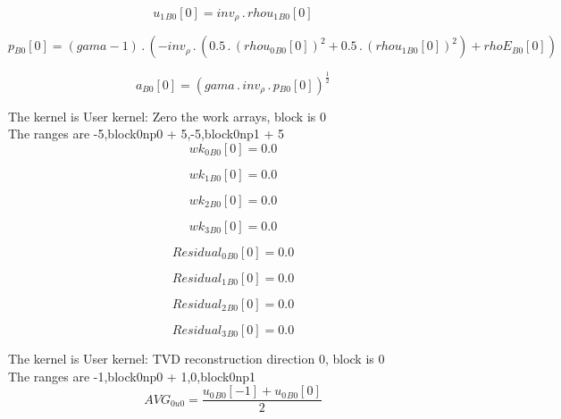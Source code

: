 \documentclass{article}
\begin{document}
\begin{dmath}{u_{1}{_{B0}}}[{0}] = inv_{\rho} \,.\, {rhou_{1}{_{B0}}}[{0}]\end{dmath}

\begin{dmath}{p{_{B0}}}[{0}] = \left(gama - 1\right) \,.\, \left(- inv_{\rho} \,.\, \left(0.5 \,.\, \left({rhou_{0}{_{B0}}}[{0}] \right)^{2} + 0.5 \,.\, \left({rhou_{1}{_{B0}}}[{0}] \right)^{2}\right) + {rhoE{_{B0}}}[{0}]\right)\end{dmath}

\begin{dmath}{a{_{B0}}}[{0}] = \left(gama \,.\, inv_{\rho} \,.\, {p{_{B0}}}[{0}] \right)^{\frac{1}{2}}\end{dmath}

\noindent The kernel is User kernel: Zero the work arrays, block is 0\\\noindent The ranges are -5,block0np0 + 5,-5,block0np1 + 5\\\begin{dmath}{wk_{0}{_{B0}}}[{0}] = 0.0\end{dmath}

\begin{dmath}{wk_{1}{_{B0}}}[{0}] = 0.0\end{dmath}

\begin{dmath}{wk_{2}{_{B0}}}[{0}] = 0.0\end{dmath}

\begin{dmath}{wk_{3}{_{B0}}}[{0}] = 0.0\end{dmath}

\begin{dmath}{Residual_{0}{_{B0}}}[{0}] = 0.0\end{dmath}

\begin{dmath}{Residual_{1}{_{B0}}}[{0}] = 0.0\end{dmath}

\begin{dmath}{Residual_{2}{_{B0}}}[{0}] = 0.0\end{dmath}

\begin{dmath}{Residual_{3}{_{B0}}}[{0}] = 0.0\end{dmath}

\noindent The kernel is User kernel: TVD reconstruction direction 0, block is 0\\\noindent The ranges are -1,block0np0 + 1,0,block0np1\\\begin{dmath}AVG_{0 u0} = \frac{{u_{0}{_{B0}}}[{-1}] + {u_{0}{_{B0}}}[{0}]}{2}\end{dmath}
\end{document}
